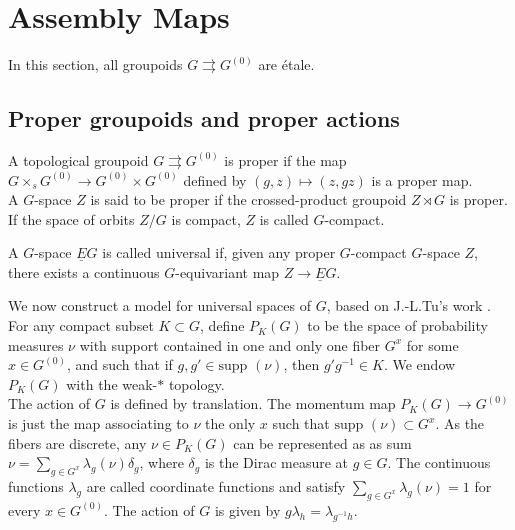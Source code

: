 \section{Assembly Maps}

In this section, all groupoids $G\rightrightarrows G^{(0)}$ are étale. 

\subsection{Proper groupoids and proper actions}

\begin{definition}
A topological groupoid $G\rightrightarrows G^{(0)}$ is proper if the map $G\times_s G^{(0)}\rightarrow G^{(0)}\times G^{(0)}$ defined by $(g,z)\mapsto (z,gz)$ is a proper map.\\
A $G$-space $Z$ is said to be proper if the crossed-product groupoid $Z\rtimes G$ is proper. If the space of orbits $Z/G$ is compact, $Z$ is called $G$-compact.\\
\end{definition}

\begin{definition}
A $G$-space $\underline E G$ is called universal if, given any proper $G$-compact $G$-space $Z$, there exists a continuous $G$-equivariant map $Z\rightarrow \underline E G$.
\end{definition}

We now construct a model for universal spaces of $G$, based on J.-L.Tu's work \cite{TuBC2}. For any compact subset $K\subset G$, define $P_K(G)$ to be the space of probability measures $\nu $ with support contained in one and only one fiber $G^x$ for some $x\in G^{(0)}$, and such that if $g,g'\in \text{supp }(\nu)$, then $g'g^{-1}\in K$. We endow $P_K(G)$ with the weak-$*$ topology.\\

The action of $G$ is defined by translation. The momentum map $P_K(G)\rightarrow G^{(0)}$ is just the map associating to $\nu$ the only $x$ such that $\text{supp }(\nu) \subset G^x$. As the fibers are discrete, any $\nu\in P_K(G)$ can be represented as as sum $\nu = \sum_{g\in G^x} \lambda_g(\nu)\delta_g$, where $\delta_g$ is the Dirac measure at $g\in G $. The continuous functions $\lambda_g$ are called coordinate functions and satisfy $\sum_{g\in G^x} \lambda_g(\nu) =1$ for every $x\in G^{(0)}$. The action of $G$ is given by $g\lambda_h = \lambda_{g^{-1}h}$.\\

